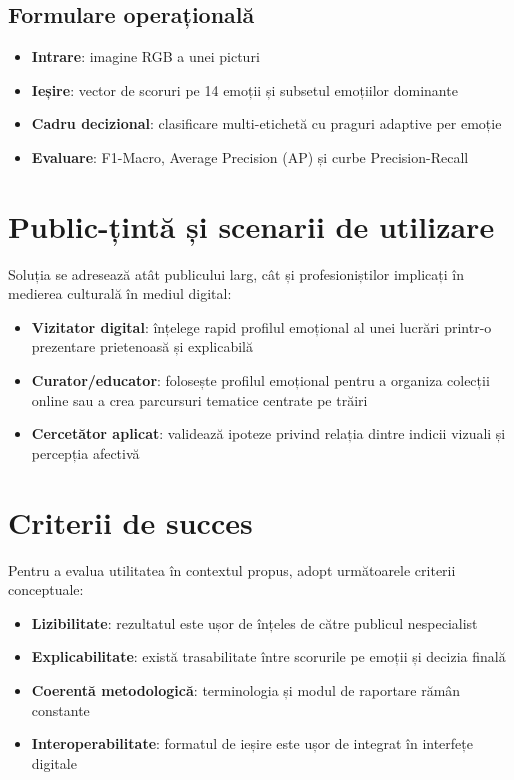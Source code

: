 \subsection{Formulare operațională}

\begin{itemize}
  \item \textbf{Intrare}: imagine RGB a unei picturi
  \item \textbf{Ieșire}: vector de scoruri pe 14 emoții și subsetul emoțiilor dominante
  \item \textbf{Cadru decizional}: clasificare multi-etichetă cu praguri adaptive per emoție
  \item \textbf{Evaluare}: F1-Macro, Average Precision (AP) și curbe Precision-Recall
\end{itemize}

\section{Public-țintă și scenarii de utilizare}
\label{sec:intro-public}

Soluția se adresează atât publicului larg, cât și profesioniștilor implicați în medierea culturală în mediul digital:

\begin{itemize}
  \item \textbf{Vizitator digital}: înțelege rapid profilul emoțional al unei lucrări printr-o prezentare prietenoasă și explicabilă
  \item \textbf{Curator/educator}: folosește profilul emoțional pentru a organiza colecții online sau a crea parcursuri tematice centrate pe trăiri
  \item \textbf{Cercetător aplicat}: validează ipoteze privind relația dintre indicii vizuali și percepția afectivă
\end{itemize}

\section{Criterii de succes}
\label{sec:intro-criterii}

Pentru a evalua utilitatea în contextul propus, adopt următoarele criterii conceptuale:

\begin{itemize}
  \item \textbf{Lizibilitate}: rezultatul este ușor de înțeles de către publicul nespecialist
  \item \textbf{Explicabilitate}: există trasabilitate între scorurile pe emoții și decizia finală
  \item \textbf{Coerentă metodologică}: terminologia și modul de raportare rămân constante
  \item \textbf{Interoperabilitate}: formatul de ieșire este ușor de integrat în interfețe digitale
\end{itemize}

